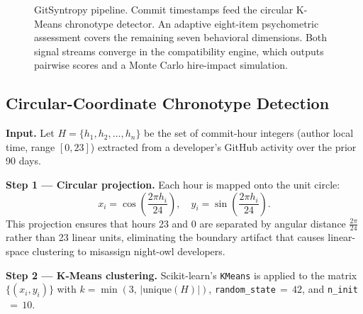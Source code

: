 \documentclass[conference]{IEEEtran}
\begin{document}
\begin{figure}[t]
  \centering
  \caption{GitSyntropy pipeline. Commit timestamps feed the circular
    K-Means chronotype detector. An adaptive eight-item psychometric
    assessment covers the remaining seven behavioral dimensions.
    Both signal streams converge in the compatibility engine, which
    outputs pairwise scores and a Monte Carlo hire-impact simulation.}
  \label{fig:architecture}
\end{figure}

\subsection{Circular-Coordinate Chronotype Detection}
\label{sec:chrono}

\textbf{Input.}
Let $H = \{h_1, h_2, \ldots, h_n\}$ be the set of commit-hour
integers (author local time, range $[0,23]$) extracted from a
developer's GitHub activity over the prior 90 days.

\textbf{Step 1 — Circular projection.}
Each hour is mapped onto the unit circle:
\begin{equation}
  x_i = \cos\!\left(\frac{2\pi h_i}{24}\right),\quad
  y_i = \sin\!\left(\frac{2\pi h_i}{24}\right).
  \label{eq:circular}
\end{equation}
This projection ensures that hours 23 and 0 are separated by angular
distance $\tfrac{2\pi}{24}$ rather than 23 linear units, eliminating
the boundary artifact that causes linear-space clustering to
misassign night-owl developers.

\textbf{Step 2 — K-Means clustering.}
Scikit-learn's \texttt{KMeans} is applied to the matrix
$\{(x_i, y_i)\}$ with $k = \min(3,\,|\text{unique}(H)|)$,
\texttt{random\_state}$\,{=}\,42$, and \texttt{n\_init}$\,{=}\,10$.
\end{document}
